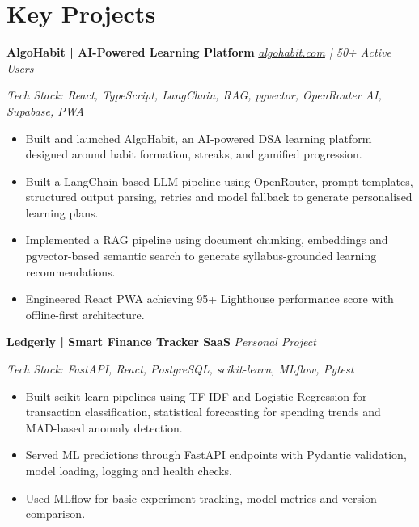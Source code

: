 \documentclass[11pt,a4paper]{article}
\newcommand{\projectheading}[2]{
  \textbf{\color{navyblue}#1} \hfill \textit{\color{lightgray}#2}
  \vspace{-2pt}
}
\begin{document}
\section{Key Projects}

\projectheading{AlgoHabit | AI-Powered Learning Platform}{\href{https://algohabit.com}{algohabit.com} | 50+ Active Users}
\vspace{1pt}
\textit{\small Tech Stack: React, TypeScript, LangChain, RAG, pgvector, OpenRouter AI, Supabase, PWA}
\vspace{2pt}
\begin{itemize}
\item Built and launched AlgoHabit, an AI-powered DSA learning platform designed around habit formation, streaks, and gamified progression.
\item Built a LangChain-based LLM pipeline using OpenRouter, prompt templates, structured output parsing, retries and model fallback to generate personalised learning plans.
\item Implemented a RAG pipeline using document chunking, embeddings and pgvector-based semantic search to generate syllabus-grounded learning recommendations.
\item Engineered React PWA achieving 95+ Lighthouse performance score with offline-first architecture.
\end{itemize}

\vspace{7pt}

\projectheading{Ledgerly | Smart Finance Tracker SaaS}{Personal Project}
\vspace{1pt}
\textit{\small Tech Stack: FastAPI, React, PostgreSQL, scikit-learn, MLflow, Pytest}
\vspace{2pt}
\begin{itemize}
\item Built scikit-learn pipelines using TF-IDF and Logistic Regression for transaction classification, statistical forecasting for spending trends and MAD-based anomaly detection.
\item Served ML predictions through FastAPI endpoints with Pydantic validation, model loading, logging and health checks.
\item Used MLflow for basic experiment tracking, model metrics and version comparison.
\end{itemize}

\vspace{7pt}
\end{document}
